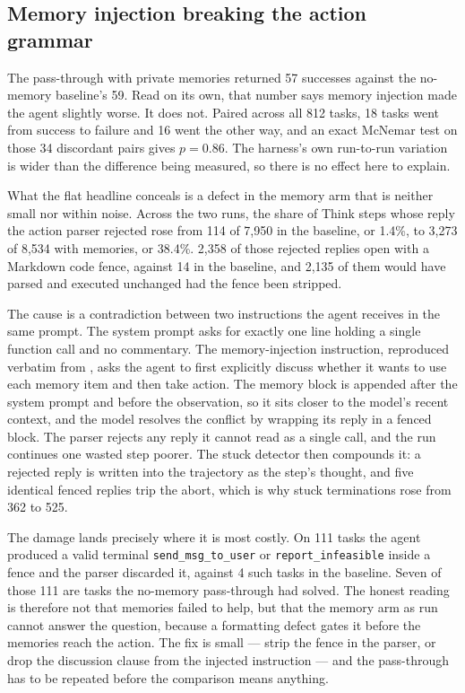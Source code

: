 \subsection{Memory injection breaking the action grammar}\label{sec:difficulty-parse}

The pass-through with private memories returned 57 successes against the no-memory baseline's 59. Read on its own, that number says memory injection made the agent slightly worse. It does not. Paired across all 812 tasks, 18 tasks went from success to failure and 16 went the other way, and an exact McNemar test on those 34 discordant pairs gives $p = 0.86$. The harness's own run-to-run variation is wider than the difference being measured, so there is no effect here to explain.

What the flat headline conceals is a defect in the memory arm that is neither small nor within noise. Across the two runs, the share of Think steps whose reply the action parser rejected rose from 114 of 7,950 in the baseline, or 1.4\%, to 3,273 of 8,534 with memories, or 38.4\%. 2,358 of those rejected replies open with a Markdown code fence, against 14 in the baseline, and 2,135 of them would have parsed and executed unchanged had the fence been stripped.

The cause is a contradiction between two instructions the agent receives in the same prompt. The system prompt asks for exactly one line holding a single function call and no commentary. The memory-injection instruction, reproduced verbatim from \citet{ouyang2025reasoningbank}, asks the agent to first explicitly discuss whether it wants to use each memory item and then take action. The memory block is appended after the system prompt and before the observation, so it sits closer to the model's recent context, and the model resolves the conflict by wrapping its reply in a fenced block. The parser rejects any reply it cannot read as a single call, and the run continues one wasted step poorer. The stuck detector then compounds it: a rejected reply is written into the trajectory as the step's thought, and five identical fenced replies trip the abort, which is why stuck terminations rose from 362 to 525.

The damage lands precisely where it is most costly. On 111 tasks the agent produced a valid terminal \texttt{send\_msg\_to\_user} or \texttt{report\_infeasible} inside a fence and the parser discarded it, against 4 such tasks in the baseline. Seven of those 111 are tasks the no-memory pass-through had solved. The honest reading is therefore not that memories failed to help, but that the memory arm as run cannot answer the question, because a formatting defect gates it before the memories reach the action. The fix is small — strip the fence in the parser, or drop the discussion clause from the injected instruction — and the pass-through has to be repeated before the comparison means anything.

